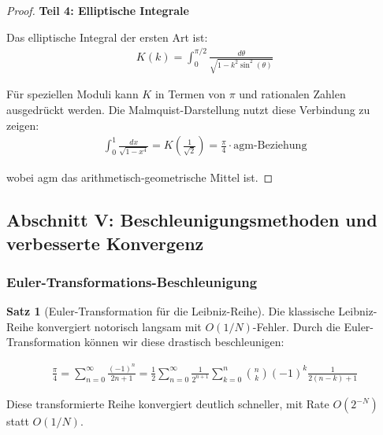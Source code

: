 \documentclass[a4paper,12pt,twoside]{report}
\theoremstyle{definition}
\newtheorem{satz}{Satz}
\begin{document}
\begin{proof}
\textbf{Teil 4: Elliptische Integrale}

Das elliptische Integral der ersten Art ist:
\begin{align}
	K(k) = \int_0^{\pi/2} \frac{d\theta}{\sqrt{1-k^2\sin^2(\theta)}}
\end{align}

Für speziellen Moduli kann $K$ in Termen von $\pi$ und rationalen Zahlen ausgedrückt werden. Die Malmquist-Darstellung nutzt diese Verbindung zu zeigen:
\begin{align}
	\int_0^1 \frac{dx}{\sqrt{1-x^4}} = K\left(\frac{1}{\sqrt{2}}\right) = \frac{\pi}{4} \cdot \text{agm-Beziehung}
\end{align}

wobei agm das arithmetisch-geometrische Mittel ist.
\end{proof}

\subsection{Abschnitt V: Beschleunigungsmethoden und verbesserte Konvergenz}

\subsubsection{Euler-Transformations-Beschleunigung}

\begin{satz}[Euler-Transformation für die Leibniz-Reihe]
Die klassische Leibniz-Reihe konvergiert notorisch langsam mit $O(1/N)$-Fehler. Durch die Euler-Transformation können wir diese drastisch beschleunigen:

\begin{align}
	\frac{\pi}{4} = \sum_{n=0}^{\infty} \frac{(-1)^n}{2n+1} = \frac{1}{2} \sum_{n=0}^{\infty} \frac{1}{2^{n+1}} \sum_{k=0}^{n} \binom{n}{k} (-1)^k \frac{1}{2(n-k)+1}
	\label{eq:euler_transform}
\end{align}

Diese transformierte Reihe konvergiert deutlich schneller, mit Rate $O(2^{-N})$ statt $O(1/N)$.
\end{satz}
\end{document}
